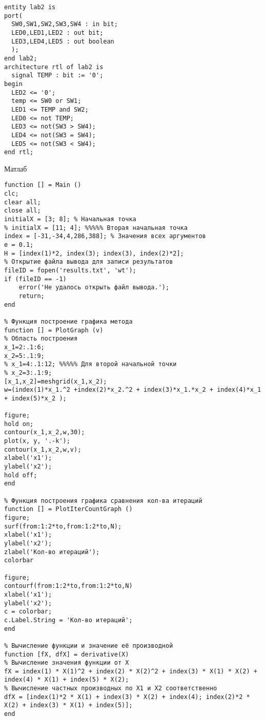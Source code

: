 \begin{frame}[fragile]
  \lstset{style=vhdl}
\begin{lstlisting}[label=lst:VHDL,caption=Описание схемы]
entity lab2 is
port(
  SW0,SW1,SW2,SW3,SW4 : in bit;
  LED0,LED1,LED2 : out bit;
  LED3,LED4,LED5 : out boolean
  );
end lab2;
architecture rtl of lab2 is
  signal TEMP : bit := '0';
begin
  LED2 <= '0';
  temp <= SW0 or SW1;
  LED1 <= TEMP and SW2;
  LED0 <= not TEMP;
  LED3 <= not(SW3 > SW4);
  LED4 <= not(SW3 = SW4);
  LED5 <= not(SW3 < SW4);
end rtl;
\end{lstlisting}

\end{frame}

\begin{frame}{Матлаб}
  \lstset{style=matlab}
\begin{lstlisting}[label=lst:VHDL,caption=Описание схемы]
function [] = Main ()
clc;
clear all;                     
close all;
initialX = [3; 8]; % Начальная точка  
% initialX = [11; 4]; %%%%% Вторая начальная точка  
index = [-31,-34,4,286,388]; % Значения всех аргументов
e = 0.1;                    
H = [index(1)*2, index(3); index(3), index(2)*2];         
% Открытие файла вывода для записи результатов
fileID = fopen('results.txt', 'wt');
if (fileID == -1)
    error('Не удалось открыть файл вывода.');
    return;
end

% Функция построение графика метода
function [] = PlotGraph (v)
% Область построения
x_1=2:.1:6;
x_2=5:.1:9;
% x_1=4:.1:12; %%%%% Для второй начальной точки                 
% x_2=3:.1:9;
[x_1,x_2]=meshgrid(x_1,x_2);
w=(index(1)*x_1.^2 +index(2)*x_2.^2 + index(3)*x_1.*x_2 + index(4)*x_1 + index(5)*x_2 );

figure;
hold on;
contour(x_1,x_2,w,30);
plot(x, y, '.-k');
contour(x_1,x_2,w,v);
xlabel('x1');
ylabel('x2');
hold off;
end

% Функция построения графика сравнения кол-ва итераций
function [] = PlotIterCountGraph ()
figure;
surf(from:1:2*to,from:1:2*to,N);
xlabel('x1');
ylabel('x2');
zlabel('Кол-во итераций');
colorbar

figure;
contourf(from:1:2*to,from:1:2*to,N)
xlabel('x1');
ylabel('x2');
c = colorbar;
c.Label.String = 'Кол-во итераций';
end

% Вычисление функции и значение её производной
function [fX, dfX] = derivative(X) 
% Вычисление значения функции от Х
fX = index(1) * X(1)^2 + index(2) * X(2)^2 + index(3) * X(1) * X(2) + index(4) * X(1) + index(5) * X(2);
% Вычисление частных производных по Х1 и Х2 соответственно
dfX = [index(1)*2 * X(1) + index(3) * X(2) + index(4); index(2)*2 * X(2) + index(3) * X(1) + index(5)];
end
\end{lstlisting}

\end{frame}